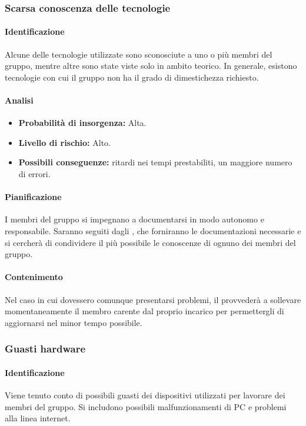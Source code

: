 \subsubsection{Scarsa conoscenza delle tecnologie}

\paragraph {Identificazione}
Alcune delle tecnologie utilizzate sono sconosciute a uno o più membri del gruppo, mentre altre sono state viste solo in ambito teorico. In generale, esistono tecnologie con cui il gruppo non ha il grado di dimestichezza richiesto.

\paragraph {Analisi}
\begin{itemize}
	\item \textbf{Probabilità di insorgenza:} Alta.
	\item \textbf{Livello di rischio:} Alto.
	\item \textbf{Possibili conseguenze:} ritardi nei tempi prestabiliti, un maggiore numero di errori.
\end{itemize}

\paragraph {Pianificazione}
I membri del gruppo si impegnano a documentarsi in modo autonomo e responsabile. Saranno seguiti dagli \adms{}, che forniranno le documentazioni necessarie e si cercherà di condividere il più possibile le conoscenze di ognuno dei membri del gruppo.

\paragraph {Contenimento} Nel caso in cui dovessero comunque presentarsi problemi, il \RdP{} provvederà a sollevare momentaneamente il membro carente dal proprio incarico per permettergli di aggiornarsi nel minor tempo possibile. 

\subsubsection{Guasti hardware}
\paragraph {Identificazione}
Viene tenuto conto di possibili guasti dei dispositivi utilizzati per lavorare dei membri del gruppo. Si includono possibili malfunzionamenti di PC e problemi alla linea internet.

